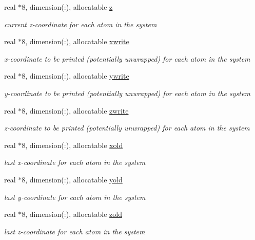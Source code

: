 \begin{DoxyCompactItemize}
real $\ast$8, dimension(\-:), allocatable \hyperlink{classatoms_ad56d525716f84f1dd47a450c903adab7}{z}
\begin{DoxyCompactList}\small\item\em current z-\/coordinate for each atom in the system \end{DoxyCompactList}\item 
real $\ast$8, dimension(\-:), allocatable \hyperlink{classatoms_a85f7d7d7038edcecede7d6e99dfaccb3}{xwrite}
\begin{DoxyCompactList}\small\item\em x-\/coordinate to be printed (potentially unwrapped) for each atom in the system \end{DoxyCompactList}\item 
real $\ast$8, dimension(\-:), allocatable \hyperlink{classatoms_aa14fc2e014bdadb63756ec374906e009}{ywrite}
\begin{DoxyCompactList}\small\item\em y-\/coordinate to be printed (potentially unwrapped) for each atom in the system \end{DoxyCompactList}\item 
real $\ast$8, dimension(\-:), allocatable \hyperlink{classatoms_a9653bdbdc3d996894be437900f1361f3}{zwrite}
\begin{DoxyCompactList}\small\item\em z-\/coordinate to be printed (potentially unwrapped) for each atom in the system \end{DoxyCompactList}\item 
real $\ast$8, dimension(\-:), allocatable \hyperlink{classatoms_a730121d9d8d50fa1cd0726b94a4036cd}{xold}
\begin{DoxyCompactList}\small\item\em last x-\/coordinate for each atom in the system \end{DoxyCompactList}\item 
real $\ast$8, dimension(\-:), allocatable \hyperlink{classatoms_af308f9cc36eba4e61c6e0a24d53a65fc}{yold}
\begin{DoxyCompactList}\small\item\em last y-\/coordinate for each atom in the system \end{DoxyCompactList}\item 
real $\ast$8, dimension(\-:), allocatable \hyperlink{classatoms_a88cfaf892614a84f207c1b54225a04dc}{zold}
\begin{DoxyCompactList}\small\item\em last z-\/coordinate for each atom in the system \end{DoxyCompactList}\end{DoxyCompactItemize}


